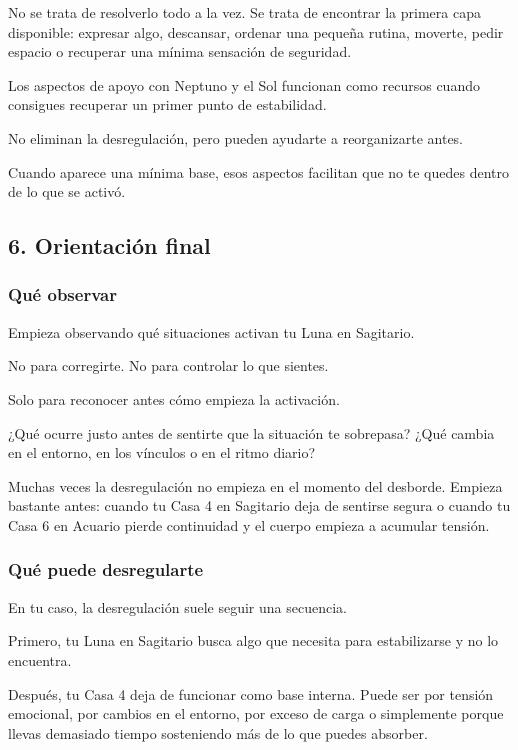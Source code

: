 \documentclass[11pt,a4paper]{article}
\begin{document}
No se trata de resolverlo todo a la vez.
Se trata de encontrar la primera capa disponible: expresar algo, descansar, ordenar una pequeña rutina, moverte, pedir espacio o recuperar una mínima sensación de seguridad.

Los aspectos de apoyo con Neptuno y el Sol funcionan como recursos cuando consigues recuperar un primer punto de estabilidad.

No eliminan la desregulación, pero pueden ayudarte a reorganizarte antes.

Cuando aparece una mínima base, esos aspectos facilitan que no te quedes dentro de lo que se activó.

\subsection{6. Orientación final}

\subsubsection*{Qué observar}

Empieza observando qué situaciones activan tu Luna en Sagitario.

No para corregirte.
No para controlar lo que sientes.

Solo para reconocer antes cómo empieza la activación.

¿Qué ocurre justo antes de sentirte que la situación te sobrepasa?
¿Qué cambia en el entorno, en los vínculos o en el ritmo diario?

Muchas veces la desregulación no empieza en el momento del desborde. Empieza bastante antes: cuando tu Casa 4 en Sagitario deja de sentirse segura o cuando tu Casa 6 en Acuario pierde continuidad y el cuerpo empieza a acumular tensión.

\subsubsection*{Qué puede desregularte}

En tu caso, la desregulación suele seguir una secuencia.

Primero, tu Luna en Sagitario busca algo que necesita para estabilizarse y no lo encuentra.

Después, tu Casa 4 deja de funcionar como base interna. Puede ser por tensión emocional, por cambios en el entorno, por exceso de carga o simplemente porque llevas demasiado tiempo sosteniendo más de lo que puedes absorber.
\end{document}
